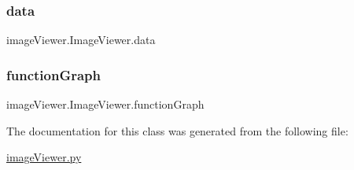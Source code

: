 \subsubsection{\texorpdfstring{data}{data}}
{\footnotesize\ttfamily image\+Viewer.\+Image\+Viewer.\+data}

\mbox{\label{classimage_viewer_1_1_image_viewer_a74f7996826475b486e3e3139cb4c1b76}} 
\subsubsection{\texorpdfstring{function\+Graph}{functionGraph}}
{\footnotesize\ttfamily image\+Viewer.\+Image\+Viewer.\+function\+Graph}



The documentation for this class was generated from the following file\+:\begin{DoxyCompactItemize}
\item 
\hyperlink{image_viewer_8py}{image\+Viewer.\+py}\end{DoxyCompactItemize}
